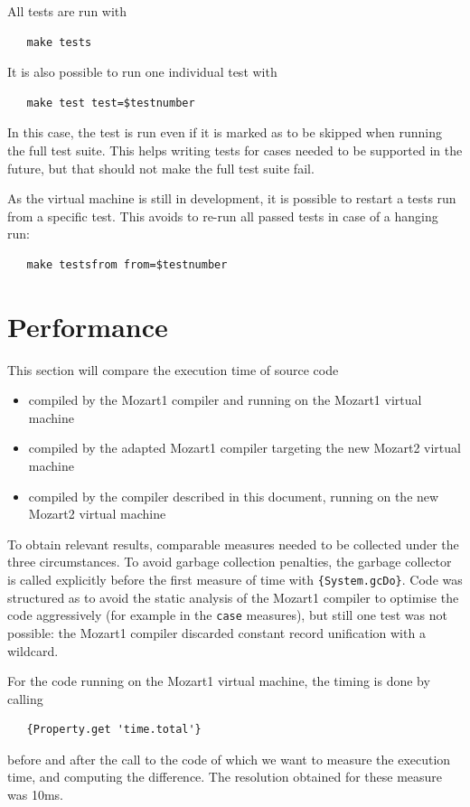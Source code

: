 \documentclass[a4paper]{memoir}
\begin{document}
All tests are run with 
\begin{lstlisting}
   make tests
\end{lstlisting}
It is also possible to run one individual test with
\begin{lstlisting}
   make test test=$testnumber
\end{lstlisting}
In this case, the test is run
even if it is marked as to be skipped when running the full test suite. This helps writing tests for cases needed to be supported in the future, but that should not make the full test suite fail.

As the virtual machine is still in development, it is possible to restart a
tests run from a specific test. This avoids to re-run all passed tests in case
of a hanging run:
\begin{lstlisting}
   make testsfrom from=$testnumber
\end{lstlisting}

\section{Performance}
This section will compare the execution time of source code
\begin{itemize}
  \item compiled by the Mozart1 compiler and running on the Mozart1 virtual
    machine 
  \item compiled by the adapted Mozart1 compiler targeting the new Mozart2 virtual
    machine
  \item compiled by the compiler described in this document, running on the new
    Mozart2 virtual machine
\end{itemize}

To obtain relevant results, comparable measures needed to be collected under the
three circumstances.
To avoid garbage collection penalties, the garbage collector is called explicitly before the
first measure of time with \lstinline!{System.gcDo}!.
Code was structured as to avoid the static analysis of the Mozart1 compiler to
optimise the code aggressively (for example in the \lstinline!case! measures), but still
one test was not possible: the Mozart1 compiler discarded constant record unification with a wildcard.

For the code running on the Mozart1 virtual machine, the timing is done by
calling 
\begin{lstlisting}
   {Property.get 'time.total'}
\end{lstlisting}
before and after the call to the code of which we want to measure the execution
time, and computing the difference. The resolution obtained for these measure was 10ms.
\end{document}
